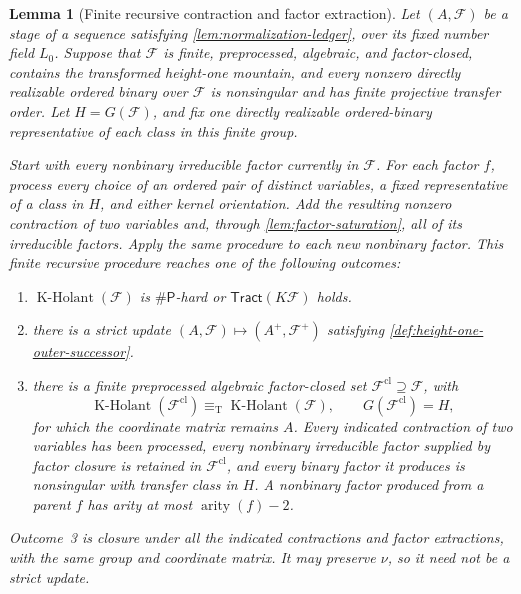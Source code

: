 \documentclass[11pt,letterpaper,onecolumn]{article}
\theoremstyle{plain}
\newtheorem{lemma}[lemma]{Lemma}
\theoremstyle{definition}
\theoremstyle{remark}
\newcommand{\cF}{\mathcal F}
\newcommand{\KHolant}{\operatorname{K\text{-}Holant}}
\newcommand{\Tract}{\mathsf{Tract}}
\newcommand{\SharpP}{\#\mathsf P}
\newcommand{\arity}{\operatorname{arity}}
\newcommand{\equivT}{\equiv_{\mathrm T}}
\begin{document}
	\begin{lemma}[Finite recursive contraction and factor extraction]
		\label{lem:height-one-card-saturation}
		Let \((A,\cF)\) be a stage of a sequence satisfying
		\cref{lem:normalization-ledger}, over its fixed number field \(L_0\).
		Suppose that \(\cF\) is finite,
		preprocessed, algebraic, and factor-closed, contains the transformed height-one mountain,
		and every nonzero directly realizable ordered binary over \(\cF\) is
		nonsingular and has finite projective transfer order.  Let
		\(H=G(\cF)\), and fix one directly realizable ordered-binary
		representative of each class in this finite group.
		
		Start with every nonbinary irreducible factor currently in \(\cF\).  For
		each factor \(f\), process every choice of an ordered pair of
		distinct variables, a fixed representative of a class in \(H\), and either
		kernel orientation.  Add the resulting nonzero contraction of two variables and, through
		\cref{lem:factor-saturation}, all of its irreducible factors.
		Apply the same procedure to each new nonbinary factor.  This
		finite recursive procedure reaches one of the following outcomes:
		\begin{enumerate}
			\item \(\KHolant(\cF)\) is \(\SharpP\)-hard or
			\(\Tract(K\cF)\) holds.
            \item there is a strict update \((A,\cF)\mapsto(A^+,\cF^+)\)
            satisfying \cref{def:height-one-outer-successor}.
			\item there is a finite preprocessed algebraic factor-closed set
			\(\cF^{\mathrm{cl}}\supseteq\cF\), with
			\[
			\KHolant(\cF^{\mathrm{cl}})\equivT\KHolant(\cF),
			\qquad G(\cF^{\mathrm{cl}})=H,
			\]
			for which the coordinate matrix remains \(A\).  Every indicated
			contraction of two variables has been processed, every
			nonbinary irreducible factor supplied by factor closure is retained in
			\(\cF^{\mathrm{cl}}\), and every binary factor it produces is
			nonsingular with transfer class in \(H\).  A nonbinary factor produced
			from a parent \(f\) has arity at most \(\arity(f)-2\).
		\end{enumerate}
        Outcome~3 is closure under all the indicated contractions and factor
        extractions, with the same group and coordinate matrix. It may preserve
        \(\nu\), so it need not be a strict update.
	\end{lemma}
	
\end{document}
